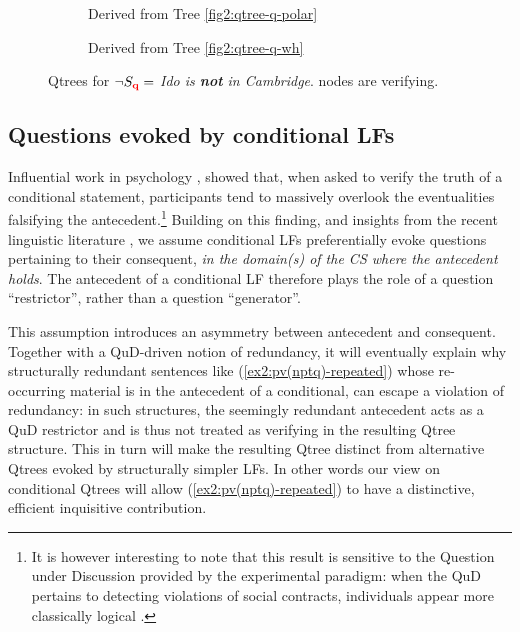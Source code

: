 \begin{figure}[H]
	\centering
	\begin{subfigure}[b]{.3\linewidth}
		\centering
		\caption{Derived from Tree \ref{fig2:qtree-q-polar}}\label{fig2:qtree-nq-polar}
	\end{subfigure}\qquad
	\begin{subfigure}[b]{.3\linewidth}
		\centering
		\scalebox{1}{
			\begin{forest}
				[CS [\fbox{$\p$}][{$\q$}][\fbox{$\r$}][\fbox{...}]]
			\end{forest}
		}
		\caption{Derived from Tree \ref{fig2:qtree-q-wh}}\label{fig2:qtree-nq-wh}
	\end{subfigure}
	\caption{Qtrees for $\neg S\protect_{\textbf{\textcolor{red}{q}}}=$ \textit{Ido is \textbf{not} in Cambridge}. \setlength{\fboxsep}{1pt} nodes are verifying.}
	\label{fig2:qtrees-nq}
\end{figure}



\subsection{Questions evoked by conditional LFs}
Influential work in psychology \citep{Wason1968}, showed that, when asked to verify the truth of a conditional statement, participants tend to massively overlook the eventualities falsifying the antecedent.\footnote{It is however interesting to note that this result is sensitive to the Question under Discussion provided by the experimental paradigm: when the QuD pertains to detecting violations of social contracts, individuals appear more classically logical \cite{Cosmides1989}.} Building on this finding, and insights from the recent linguistic literature \citep{Aloni2022}, we assume conditional LFs preferentially evoke questions pertaining to their consequent, \textit{in the domain(s) of the CS where the antecedent holds}. The antecedent of a conditional LF therefore plays the role of a question ``restrictor'', rather than a question ``generator''.

This assumption introduces an asymmetry between antecedent and consequent. Together with a QuD-driven notion of redundancy, it will eventually explain why structurally redundant sentences like (\ref{ex2:pv(nptq)-repeated}) whose re-occurring material is in the antecedent of a conditional, can escape a violation of redundancy: in such structures, the seemingly redundant antecedent acts as a QuD restrictor and is thus not treated as verifying in the resulting Qtree structure. This in turn will make the resulting Qtree distinct from alternative Qtrees evoked by structurally simpler LFs. In other words our view on conditional Qtrees will allow (\ref{ex2:pv(nptq)-repeated}) to have a distinctive, efficient inquisitive contribution.

